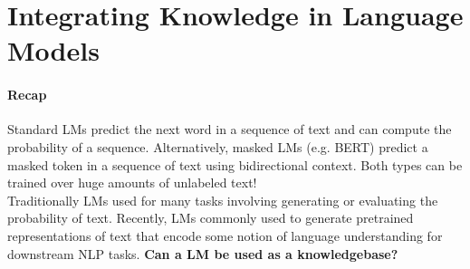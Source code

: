 \documentclass[10pt]{report}
\begin{document}
\section{Integrating Knowledge in Language Models}
\paragraph{Recap} Standard LMs predict the next word in a sequence of text and can compute the probability of a sequence. Alternatively, masked LMs (e.g. BERT) predict a masked token in a sequence of text using bidirectional context. Both types can be trained over huge amounts of unlabeled text!\\
Traditionally LMs used for many tasks involving generating or evaluating the probability of text. Recently, LMs commonly used to generate pretrained representations of text that encode some notion of language understanding for downstream NLP tasks. \textbf{Can a LM be used as a knowledgebase?}
\end{document}
